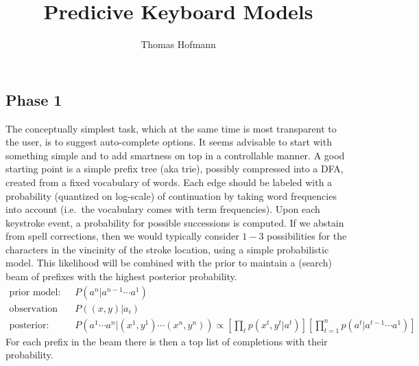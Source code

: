 \documentclass[12pt,a4paper]{article}
\author{Thomas Hofmann}
\title{Predicive Keyboard Models}
\begin{document}
\maketitle

\subsection*{Phase 1}

The conceptually simplest task, which at the same time is most transparent to the user, is to suggest auto-complete options. It seems advisable to start with something simple and to add smartness on top in a controllable manner. A good starting point is a simple prefix tree (aka trie), possibly compressed into a DFA, created from a fixed vocabulary of words. Each edge should be labeled with a probability (quantized on log-scale) of continuation by taking word frequencies into account (i.e.~the vocabulary comes with term frequencies). Upon each keystroke event, a probability for possible successions is computed. If we abstain from spell corrections, then we would typically consider $1-3$ possibilities for the characters in the vincinity of the stroke location, using a simple probabilistic model. This likelihood will be combined with the prior to maintain a (search) beam of  prefixes with the highest posterior probability.
\begin{align}
\text{prior model:} \quad & P(a^n | a^{n-1} \cdots a^1) \\
\text{observation model:} \quad & P((x,y) | a_i)\\
\text{posterior:} \quad & P(a^1 \cdots a^n | (x^1,y^1) \cdots (x^n,y^n)) \propto \left[ \prod_t p(x^t,y^t|a^t) \right] \left[ \prod_{t=1}^n p(a^t|a^{t-1} \cdots a^1) \right]
\end{align}
For each prefix in the beam there is then a top list of completions with their probability. 




\newpage





\end{document}
